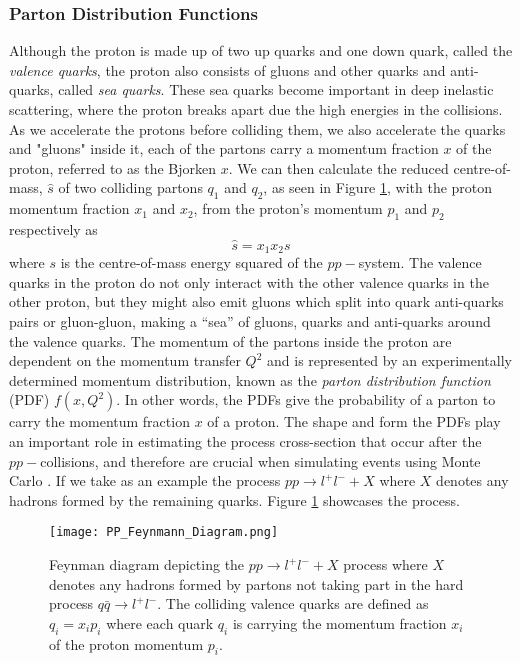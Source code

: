 \documentclass[12pt, a4paper]{book}
\begin{document}
\subsubsection{Parton Distribution Functions}\label{sec:pdf}
Although the proton is made up of two up quarks and one down quark, called the \textit{valence quarks}, the proton also consists of gluons and other quarks and anti-quarks, called \textit{sea quarks}. These sea quarks become important in deep inelastic scattering, 
where the proton breaks apart due the high energies in the collisions. As we accelerate the protons before colliding them, we also accelerate the quarks and "gluons" inside it, each of the partons carry a momentum fraction $x$ of the proton, 
referred to as the Bjorken $x$. We can then calculate the reduced centre-of-mass, $\hat{s}$ of two colliding partons $q_1$ and $q_2$, as seen in Figure \ref{fig:Feynann_PDF}, with the proton momentum fraction $x_1$ and $x_2$, from the proton's momentum $p_1$ and $p_2$ respectively as
$$
\hat{s}=x_1x_2s
$$
where $s$ is the centre-of-mass energy squared of the $pp-$system. The valence quarks in the proton do not only interact with the other valence quarks in the other proton, but they might also emit gluons which split into quark anti-quarks pairs 
or gluon-gluon, making a “sea” of gluons, quarks and anti-quarks around the valence quarks. The momentum of the partons inside the proton are dependent on the momentum transfer $Q^2$ and is represented by an experimentally determined momentum distribution, 
known as the \textit{parton distribution function} (PDF) \cite{PDF} $f(x,Q^2)$. In other words, the PDFs give the probability of a parton to carry the momentum fraction $x$ of a proton. The shape and form the PDFs play 
an important role in estimating the process cross-section that occur after the $pp-$collisions, and therefore are crucial when simulating events using Monte Carlo \cite{MC_PDF}.  If we take as an example the process 
$pp\rightarrow l^+l^-+X$ where $X$ denotes any hadrons formed by the remaining quarks. Figure \ref{fig:Feynann_PDF} showcases the process.
\begin{figure}[!ht]
    \centering
    \texttt{[image: PP\_Feynmann\_Diagram.png]}
    \caption[Feynman diagram from $pp-$collision]{Feynman diagram depicting the $pp\rightarrow l^+l^-+X$ process where $X$ denotes any hadrons formed by partons
    not taking part in the hard process $q\bar{q}\rightarrow l^+l^-$. The colliding valence quarks are defined as $q_i=x_ip_i$ where each quark $q_i$ is carrying the momentum fraction $x_i$ of the proton momentum $p_i$.}\label{fig:Feynann_PDF}
\end{figure}
\end{document}
